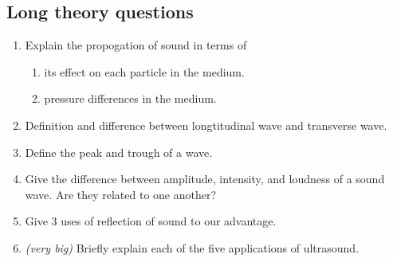 \documentclass[12pt]{article}
\begin{document}
\subsection*{Long theory questions}
\begin{enumerate}
	\item Explain the propogation of sound in terms of
	\begin{enumerate}
		\item its effect on each particle in the medium.
		\item pressure differences in the medium.
	\end{enumerate}
	\item Definition and difference between longtitudinal wave and transverse wave.
	\item Define the peak and trough of a wave.
	\item Give the difference between amplitude, intensity, and loudness of a sound wave. Are they related to one another?
	\item Give 3 uses of reflection of sound to our advantage.
	\item \textit{(very big)} Briefly explain each of the five applications of ultrasound.
\end{enumerate}


\end{document}
